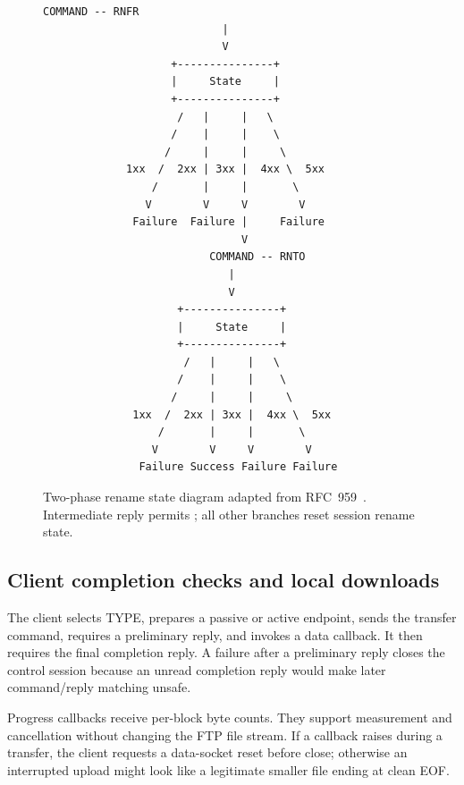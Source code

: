 \begin{figure}[htbp]
\centering
\begin{lstlisting}[basicstyle=\ttfamily\scriptsize,columns=fixed,numbers=none]
                         COMMAND -- RNFR
                            |
                            V
                    +---------------+
                    |     State     |
                    +---------------+
                     /   |     |   \
                    /    |     |    \
                   /     |     |     \
             1xx  /  2xx | 3xx |  4xx \  5xx
                 /       |     |       \
                V        V     V        V
              Failure  Failure |     Failure
                               V
                          COMMAND -- RNTO
                             |
                             V
                     +---------------+
                     |     State     |
                     +---------------+
                      /   |     |   \
                     /    |     |    \
                    /     |     |     \
              1xx  /  2xx | 3xx |  4xx \  5xx
                  /       |     |       \
                 V        V     V        V
               Failure Success Failure Failure
\end{lstlisting}
\caption{Two-phase rename state diagram adapted from RFC~959~\cite{rfc959}. Intermediate reply  permits ; all other branches reset session rename state.}
\label{fig:rfc959-rename}
\end{figure}

\subsection{Client completion checks and local downloads}
The client selects TYPE, prepares a passive or active endpoint, sends the transfer command, requires a preliminary reply, and invokes a data callback. It then requires the final completion reply. A failure after a preliminary reply closes the control session because an unread completion reply would make later command/reply matching unsafe.



Progress callbacks receive per-block byte counts. They support measurement and cancellation without changing the FTP file stream. If a callback raises during a transfer, the client requests a data-socket reset before close; otherwise an interrupted upload might look like a legitimate smaller file ending at clean EOF.

